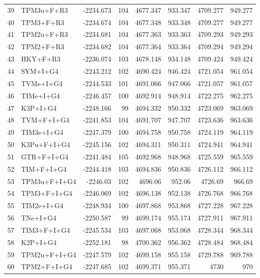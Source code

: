 \begin{longtable}{clrrrrrr}
	39 & TPM3u+F+R3 & -2234.673 & 104 & 4677.347 & 933.347 & 4709.277 & 949.277 \\ 
	40 & TPM3+F+R3 & -2234.674 & 104 & 4677.348 & 933.348 & 4709.277 & 949.277 \\ 
	41 & TPM2u+F+R3 & -2234.681 & 104 & 4677.363 & 933.363 & 4709.293 & 949.293 \\ 
	42 & TPM2+F+R3 & -2234.682 & 104 & 4677.364 & 933.364 & 4709.294 & 949.294 \\ 
	43 & HKY+F+R3 & -2236.074 & 103 & 4678.148 & 934.148 & 4709.424 & 949.424 \\ 
	44 & SYM+I+G4 & -2243.212 & 102 & 4690.424 & 946.424 & 4721.054 & 961.054 \\ 
	45 & TVMe+I+G4 & -2244.533 & 101 & 4691.066 & 947.066 & 4721.057 & 961.057 \\ 
	46 & TIMe+I+G4 & -2246.457 & 100 & 4692.914 & 948.914 & 4722.275 & 962.275 \\ 
	47 & K3P+I+G4 & -2248.166 & 99 & 4694.332 & 950.332 & 4723.069 & 963.069 \\ 
	48 & TVM+F+I+G4 & -2241.853 & 104 & 4691.707 & 947.707 & 4723.636 & 963.636 \\ 
	49 & TIM3e+I+G4 & -2247.379 & 100 & 4694.758 & 950.758 & 4724.119 & 964.119 \\ 
	50 & K3Pu+F+I+G4 & -2245.156 & 102 & 4694.311 & 950.311 & 4724.941 & 964.941 \\ 
	51 & GTR+F+I+G4 & -2241.484 & 105 & 4692.968 & 948.968 & 4725.559 & 965.559 \\ 
	52 & TIM+F+I+G4 & -2244.418 & 103 & 4694.836 & 950.836 & 4726.112 & 966.112 \\ 
	53 & TPM3u+F+I+G4 & -2246.03 & 102 & 4696.06 & 952.06 & 4726.69 & 966.69 \\ 
	54 & TPM3+F+I+G4 & -2246.069 & 102 & 4696.138 & 952.138 & 4726.768 & 966.768 \\ 
	55 & TIM2e+I+G4 & -2248.934 & 100 & 4697.868 & 953.868 & 4727.228 & 967.228 \\ 
	56 & TNe+I+G4 & -2250.587 & 99 & 4699.174 & 955.174 & 4727.911 & 967.911 \\ 
	57 & TIM3+F+I+G4 & -2245.534 & 103 & 4697.068 & 953.068 & 4728.344 & 968.344 \\ 
	58 & K2P+I+G4 & -2252.181 & 98 & 4700.362 & 956.362 & 4728.484 & 968.484 \\ 
	59 & TPM2u+F+I+G4 & -2247.579 & 102 & 4699.158 & 955.158 & 4729.788 & 969.788 \\ 
	60 & TPM2+F+I+G4 & -2247.685 & 102 & 4699.371 & 955.371 & 4730 & 970 \\ 

\end{longtable}
